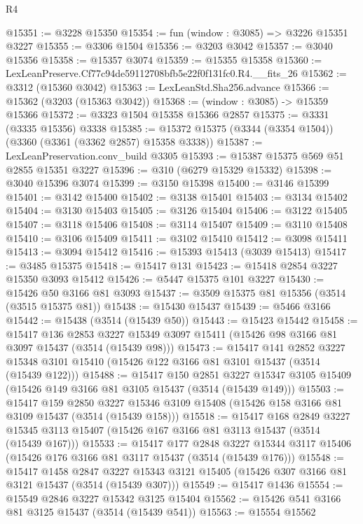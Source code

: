 \begin{lexlean}{R4}
\begin{coremodule}
@15351 := @3228 @15350
@15354 := fun (window : @3085) => @3226 @15351 @3227
@15355 := @3306 @1504
@15356 := @3203 @3042
@15357 := @3040 @15356
@15358 := @15357 @3074
@15359 := @15355 @15358
@15360 := LexLeanPreserve.Cf77c94de59112708bfb5e22f0f131fc0.R4.__fits_26
@15362 := @3312 (@15360 @3042)
@15363 := LexLeanStd.Sha256.advance
@15366 := @15362 (@3203 (@15363 @3042))
@15368 := (window : @3085) -> @15359 @15366
@15372 := @3323 @1504 @15358 @15366 @2857
@15375 := @3331 (@3335 @15356) @3338
@15385 := @15372 @15375 (@3344 (@3354 @1504)) (@3360 (@3361 (@3362 @2857) @15358 @3338))
@15387 := LexLeanPreservation.conv_build @3305
@15393 := @15387 @15375 @569 @51 @2855 @15351 @3227
@15396 := @310 (@6279 @15329 @15332)
@15398 := @3040 @15396 @3074
@15399 := @3150 @15398
@15400 := @3146 @15399
@15401 := @3142 @15400
@15402 := @3138 @15401
@15403 := @3134 @15402
@15404 := @3130 @15403
@15405 := @3126 @15404
@15406 := @3122 @15405
@15407 := @3118 @15406
@15408 := @3114 @15407
@15409 := @3110 @15408
@15410 := @3106 @15409
@15411 := @3102 @15410
@15412 := @3098 @15411
@15413 := @3094 @15412
@15416 := @15393 @15413 (@3039 @15413)
@15417 := @3485 @15375
@15418 := @15417 @131
@15423 := @15418 @2854 @3227 @15350 @3093 @15412
@15426 := @5447 @15375 @101 @3227
@15430 := @15426 @50 @3166 @81 @3093
@15437 := @3509 @15375 @81 @15356 (@3514 (@3515 @15375 @81))
@15438 := @15430 @15437
@15439 := @5466 @3166
@15442 := @15438 (@3514 (@15439 @50))
@15443 := @15423 @15442
@15458 := @15417
    @136
    @2853
    @3227
    @15349
    @3097
    @15411
    (@15426 @98 @3166 @81 @3097 @15437 (@3514 (@15439 @98)))
@15473 := @15417
    @141
    @2852
    @3227
    @15348
    @3101
    @15410
    (@15426 @122 @3166 @81 @3101 @15437 (@3514 (@15439 @122)))
@15488 := @15417
    @150
    @2851
    @3227
    @15347
    @3105
    @15409
    (@15426 @149 @3166 @81 @3105 @15437 (@3514 (@15439 @149)))
@15503 := @15417
    @159
    @2850
    @3227
    @15346
    @3109
    @15408
    (@15426 @158 @3166 @81 @3109 @15437 (@3514 (@15439 @158)))
@15518 := @15417
    @168
    @2849
    @3227
    @15345
    @3113
    @15407
    (@15426 @167 @3166 @81 @3113 @15437 (@3514 (@15439 @167)))
@15533 := @15417
    @177
    @2848
    @3227
    @15344
    @3117
    @15406
    (@15426 @176 @3166 @81 @3117 @15437 (@3514 (@15439 @176)))
@15548 := @15417
    @1458
    @2847
    @3227
    @15343
    @3121
    @15405
    (@15426 @307 @3166 @81 @3121 @15437 (@3514 (@15439 @307)))
@15549 := @15417 @1436
@15554 := @15549 @2846 @3227 @15342 @3125 @15404
@15562 := @15426 @541 @3166 @81 @3125 @15437 (@3514 (@15439 @541))
@15563 := @15554 @15562

\end{coremodule}
\end{lexlean}
